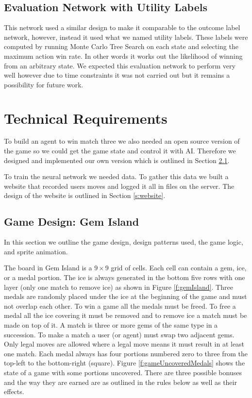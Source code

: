 \documentclass{bhamthesis}
\theoremstyle{definition}
\begin{document}
\section{Evaluation Network with Utility Labels}\label{s:nnUL}
This network used a similar design to make it comparable to the outcome label network, however, instead it used what we named utility labels. These labels were computed by running Monte Carlo Tree Search on each state and selecting the maximum action win rate. In other words it works out the likelihood of winning from an arbitrary state.
We expected this evaluation network to perform very well however due to time constraints it was not carried out but it remains a possibility for future work.

\chapter{Technical Requirements}\label{ch:techReq}
To build an agent to win match three we also needed an open source version of the game so we could get the game state and control it with AI. Therefore we designed and implemented our own version which is outlined in Section \ref{s:gamed}. 

To train the neural network we needed data. To gather this data we built a website that recorded users moves and logged it all in files on the server. The design of the website is outlined in Section \ref{s:website}.

\section{Game Design: Gem Island}\label{s:gamed}
In this section we outline the game design, design patterns used, the game logic, and sprite animation.


The board in Gem Island is a $9 \times 9$ grid of cells. Each cell can contain a gem, ice, or a medal portion. The ice is always generated in the bottom five rows with one layer (only one match to remove ice) as shown in Figure \ref{f:gemIsland}. Three medals are randomly placed under the ice at the beginning of the game and must not overlap each other. To win a game all the medals must be freed. To free a medal all the ice covering it must be removed and to remove ice a match must be made on top of it. A match is three or more gems of the same type in a succession. To make a match a user (or agent) must swap two adjacent gems. Only legal moves are allowed where a legal move means it must result in at least one match. Each medal always has four portions numbered zero to three from the top-left to the bottom-right (square). Figure \ref{f:gameUncoveredMedals} shows the state of a game with some portions uncovered. There are three possible bonuses and the way they are earned are as outlined in the rules below as well as their effects.
\end{document}
